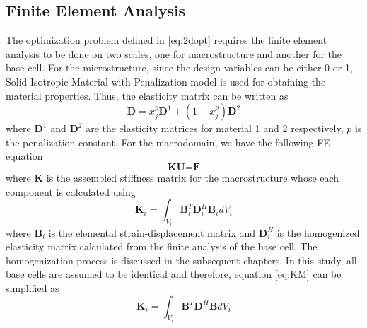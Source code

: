 \documentclass[10pt]{article}
\begin{document}
\subsection{Finite Element Analysis} 
The optimization problem defined in \eqref{eq:2dopt} requires the finite element analysis to be done on two scales, one for macrostructure and another for the base cell. For the microstructure, since the design variables can be either 0 or 1, Solid Isotropic Material with Penalization model\cite{paper:simp} is used for obtaining the material properties. Thus, the elasticity matrix can be written as
\begin{equation}
\label{eq:simp}
\textbf{D} = x_j^p\textbf{D}^1 + (1-x_j^p)\textbf{D}^2
\end{equation}
where $\textbf{D}^1$ and $\textbf{D}^2$ are the elasticity matrices for material 1 and 2 respectively, $p$ is the penalization constant.
For the macrodomain, we have the following FE equation
\begin{equation}
\textbf{KU} = \textbf{F}
\end{equation}
where $\textbf{K}$ is the assembled stiffness matrix for the macrostructure whose each component is calculated using
\begin{equation}
\label{eq:KM}
\textbf{K}_i =  \int_{V_i} \textbf{B}_i^T\textbf{D}_i^H\textbf{B}_i dV_i
\end{equation} 
where $\textbf{B}_i$ is the elemental strain-displacement matrix and $\textbf{D}_i^H$ is the homogenized elasticity matrix calculated from the finite analysis of the base cell. The homogenization process\cite{paper:homogenization} is discussed in the subsequent chapters. In this study, all base cells are assumed to be identical and therefore, equation \eqref{eq:KM} can be simplified as
\begin{equation}
\label{eq:KM1}
\textbf{K}_i =  \int_{V_i} \textbf{B}^T\textbf{D}^H\textbf{B} dV_i
\end{equation} 
\end{document}
